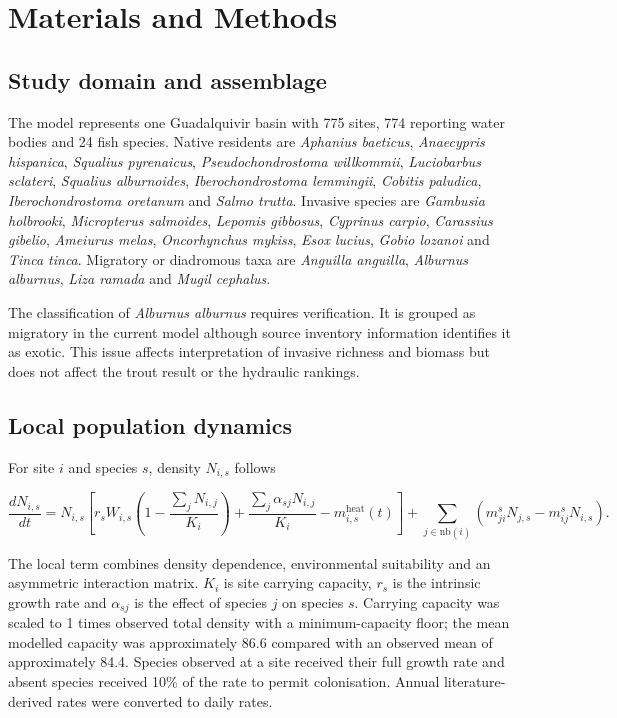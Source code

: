 \documentclass[11pt,a4paper]{article}
\begin{document}
\section{Materials and Methods}

\subsection{Study domain and assemblage}

The model represents one Guadalquivir basin with 775 sites, 774 reporting water bodies and 24 fish species. Native residents are \textit{Aphanius baeticus}, \textit{Anaecypris hispanica}, \textit{Squalius pyrenaicus}, \textit{Pseudochondrostoma willkommii}, \textit{Luciobarbus sclateri}, \textit{Squalius alburnoides}, \textit{Iberochondrostoma lemmingii}, \textit{Cobitis paludica}, \textit{Iberochondrostoma oretanum} and \textit{Salmo trutta}. Invasive species are \textit{Gambusia holbrooki}, \textit{Micropterus salmoides}, \textit{Lepomis gibbosus}, \textit{Cyprinus carpio}, \textit{Carassius gibelio}, \textit{Ameiurus melas}, \textit{Oncorhynchus mykiss}, \textit{Esox lucius}, \textit{Gobio lozanoi} and \textit{Tinca tinca}. Migratory or diadromous taxa are \textit{Anguilla anguilla}, \textit{Alburnus alburnus}, \textit{Liza ramada} and \textit{Mugil cephalus}.

The classification of \textit{Alburnus alburnus} requires verification. It is grouped as migratory in the current model although source inventory information identifies it as exotic. This issue affects interpretation of invasive richness and biomass but does not affect the trout result or the hydraulic rankings.

\subsection{Local population dynamics}

For site $i$ and species $s$, density $N_{i,s}$ follows

\begin{equation}
\frac{dN_{i,s}}{dt} = N_{i,s}\left[r_s W_{i,s}\left(1-\frac{\sum_j N_{i,j}}{K_i}\right) + \frac{\sum_j \alpha_{sj}N_{i,j}}{K_i} - m^{\mathrm{heat}}_{i,s}(t)\right]
 + \sum_{j\in\mathrm{nb}(i)}\left(m^s_{ji}N_{j,s}-m^s_{ij}N_{i,s}\right).
\end{equation}

The local term combines density dependence, environmental suitability and an asymmetric interaction matrix. $K_i$ is site carrying capacity, $r_s$ is the intrinsic growth rate and $\alpha_{sj}$ is the effect of species $j$ on species $s$. Carrying capacity was scaled to 1 times observed total density with a minimum-capacity floor; the mean modelled capacity was approximately 86.6 compared with an observed mean of approximately 84.4. Species observed at a site received their full growth rate and absent species received 10\% of the rate to permit colonisation. Annual literature-derived rates were converted to daily rates.
\end{document}
